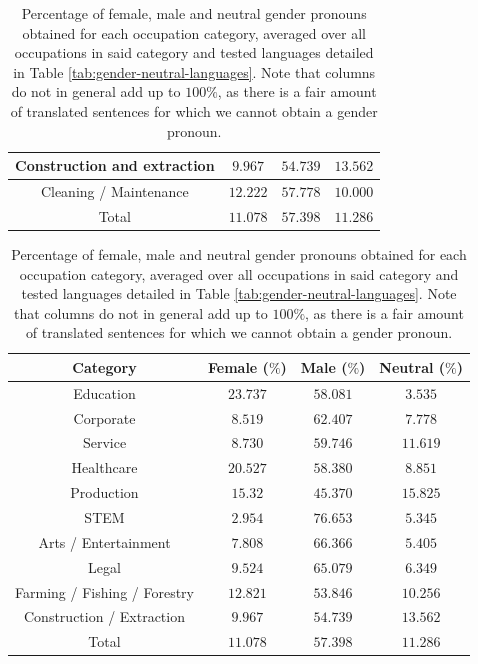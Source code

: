 \documentclass[fleqn,10pt]{article}
\begin{document}
\begin{table}[H]
{\begin{tabular}{|c|c|c|c|}
	Construction and extraction				& $9.967$		& $54.739$		& $13.562$		\\ \hline
	Cleaning / Maintenance					& $12.222$		& $57.778$		& $10.000$		\\ \hline
	\hline
	Total           						& $11.078$ 		& $57.398$ 		& $11.286$ 		\\ \hline
	\end{tabular}
	\caption{Percentage of female, male and neutral gender pronouns obtained for each occupation category, averaged over all occupations in said category and tested languages detailed in Table \ref{tab:gender-neutral-languages}. Note that columns do not in general add up to $100\%$, as there is a fair amount of translated sentences for which we cannot obtain a gender pronoun.}
	\label{tab:gender-by-category}
	}
\end{table}

\begin{table}[H]
\small{
	\centering
	\begin{tabular}{|c|c|c|c|}
	\hline
	Category 								& Female ($\%$)			& Male ($\%$)			& Neutral ($\%$)	\\ \hline
	\hline
	Education								& $23.737$				& $58.081$				& $3.535$			\\ \hline
	Corporate								& $8.519$				& $62.407$				& $7.778$			\\ \hline
	Service									& $8.730$				& $59.746$				& $11.619$			\\ \hline
	Healthcare								& $20.527$				& $58.380$				& $8.851$			\\ \hline
	Production								& $15.32$				& $45.370$				& $15.825$			\\ \hline
	STEM									& $2.954$				& $76.653$				& $5.345$			\\ \hline
	Arts / Entertainment					& $7.808$				& $66.366$				& $5.405$			\\ \hline
	Legal									& $9.524$				& $65.079$				& $6.349$			\\ \hline
	Farming / Fishing / Forestry			& $12.821$				& $53.846$				& $10.256$			\\ \hline
	Construction / Extraction				& $9.967$				& $54.739$				& $13.562$			\\ \hline
	\hline
	Total           						& $11.078$ 				& $57.398$ 				& $11.286$ 			\\ \hline
	\end{tabular}
	\caption{Percentage of female, male and neutral gender pronouns obtained for each occupation category, averaged over all occupations in said category and tested languages detailed in Table \ref{tab:gender-neutral-languages}. Note that columns do not in general add up to $100\%$, as there is a fair amount of translated sentences for which we cannot obtain a gender pronoun.}
	\label{tab:gender-by-category-grouped}
	}
\end{table}
\end{document}
